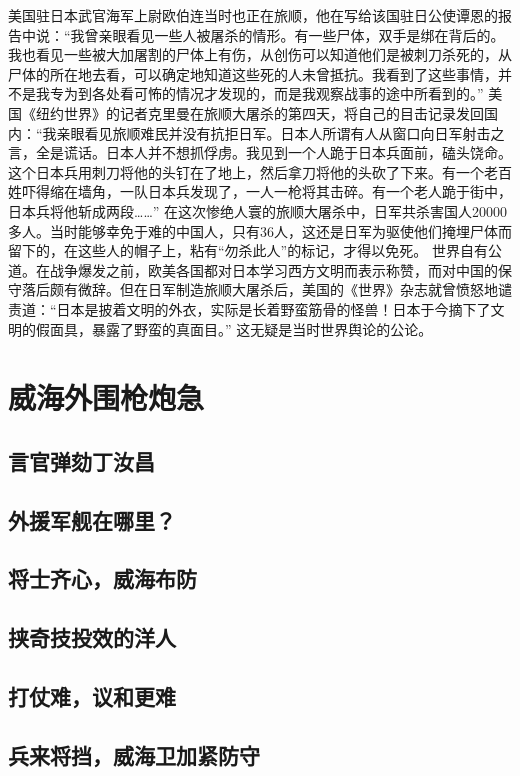 \documentclass[12pt,UTF8]{ctexbook}
\begin{document}
美国驻日本武官海军上尉欧伯连当时也正在旅顺，他在写给该国驻日公使谭恩的报告中说：“我曾亲眼看见一些人被屠杀的情形。有一些尸体，双手是绑在背后的。我也看见一些被大加屠割的尸体上有伤，从创伤可以知道他们是被刺刀杀死的，从尸体的所在地去看，可以确定地知道这些死的人未曾抵抗。我看到了这些事情，并不是我专为到各处看可怖的情况才发现的，而是我观察战事的途中所看到的。”
美国《纽约世界》的记者克里曼在旅顺大屠杀的第四天，将自己的目击记录发回国内：“我亲眼看见旅顺难民并没有抗拒日军。日本人所谓有人从窗口向日军射击之言，全是谎话。日本人并不想抓俘虏。我见到一个人跪于日本兵面前，磕头饶命。这个日本兵用刺刀将他的头钉在了地上，然后拿刀将他的头砍了下来。有一个老百姓吓得缩在墙角，一队日本兵发现了，一人一枪将其击碎。有一个老人跪于街中，日本兵将他斩成两段……”
在这次惨绝人寰的旅顺大屠杀中，日军共杀害国人20000多人。当时能够幸免于难的中国人，只有36人，这还是日军为驱使他们掩埋尸体而留下的，在这些人的帽子上，粘有“勿杀此人”的标记，才得以免死。
世界自有公道。在战争爆发之前，欧美各国都对日本学习西方文明而表示称赞，而对中国的保守落后颇有微辞。但在日军制造旅顺大屠杀后，美国的《世界》杂志就曾愤怒地谴责道：“日本是披着文明的外衣，实际是长着野蛮筋骨的怪兽！日本于今摘下了文明的假面具，暴露了野蛮的真面目。”
这无疑是当时世界舆论的公论。


\part{威海外围枪炮急}

\chapter{言官弹劾丁汝昌}
\chapter{外援军舰在哪里？}
\chapter{将士齐心，威海布防}
\chapter{挟奇技投效的洋人}
\chapter{打仗难，议和更难}
\chapter{兵来将挡，威海卫加紧防守}
\end{document}
